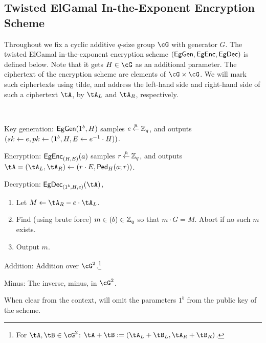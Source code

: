   







\subsection{Twisted ElGamal In-the-Exponent Encryption Scheme}\label{sec:ChanksEg:Eg}
Throughout we fix a cyclic  additive $q$-size group $\cG$ with generator $G$. The  twisted ElGamal in-the-exponent encryption scheme $(\mathsf{EgGen},\mathsf{EgEnc},\mathsf{EgDec})$ is defined below. Note that it  gets  $H\in \cG$ as an  additional parameter. The ciphertext of the encryption scheme are elements of $\cG \times \cG$. We will mark such  ciphertexts   using tilde, and  address  the left-hand side and right-hand side of such  a ciphertext $\tA$,  by $\tA_L$ and  $\tA_R$, respectively. 




\begin{algorithm}\label{alg:tEGinExp}~
	
	
	\item[Key generation:] $\mathsf{EgGen}(1^b,H)$ samples $e\mathbin{\stackrel{\mbox{\tiny R}}{\leftarrow}} {\mathbb Z}_q$, and outputs $({sk} 
	\leftarrow e,{pk} \leftarrow (1^b,H,E\leftarrow  e^{-1}\cdot H))$.
	
	\item[Encryption:] $\mathsf{EgEnc}_{(H,E)}(a)$  samples $r\mathbin{\stackrel{\mbox{\tiny R}}{\leftarrow}} {\mathbb Z}_q$, and outputs  $\tA  = (\tA _L,\tA _R)\asn (r\cdot E, \Ped_H(a;r))$. 
	\item[Decryption:] $\EgDec_{(1^b,H,e)}(\tA)$,   
	\begin{enumerate}
		\item 	Let $M \asn \tA_R - e\cdot \tA_L$.
		
		\item Find (using brute force) $m\in (b) \in {\mathbb Z}_q$ so that $m\cdot G = M$. Abort if no such $m$ exists. 
		\item Output $m$.
	\end{enumerate}
	
	\item[Addition:] Addition over  $\cG^2$.\footnote{For $\tA,\tB \in \cG^2$: $\tA +\tB \eqdef (\tA_L+\tB_L,\tA_R+\tB_R)$.}
	
	\item[Minus:]  The inverse, \ie minus, in $\cG^2$.
	
\end{algorithm}	
When clear from the context,  will omit the parameters $1^b$ from the public key of the scheme.

